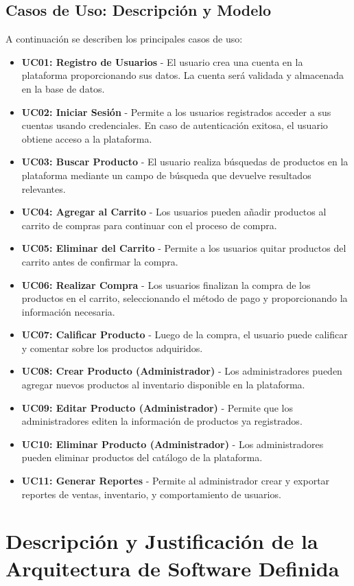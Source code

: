 \documentclass[12pt]{article}
\begin{document}
\subsection{Casos de Uso: Descripción y Modelo}
A continuación se describen los principales casos de uso:
\begin{itemize}
    \item \textbf{UC01: Registro de Usuarios} - El usuario crea una cuenta en la plataforma proporcionando sus datos. La cuenta será validada y almacenada en la base de datos.
    \item \textbf{UC02: Iniciar Sesión} - Permite a los usuarios registrados acceder a sus cuentas usando credenciales. En caso de autenticación exitosa, el usuario obtiene acceso a la plataforma.
    \item \textbf{UC03: Buscar Producto} - El usuario realiza búsquedas de productos en la plataforma mediante un campo de búsqueda que devuelve resultados relevantes.
    \item \textbf{UC04: Agregar al Carrito} - Los usuarios pueden añadir productos al carrito de compras para continuar con el proceso de compra.
    \item \textbf{UC05: Eliminar del Carrito} - Permite a los usuarios quitar productos del carrito antes de confirmar la compra.
    \item \textbf{UC06: Realizar Compra} - Los usuarios finalizan la compra de los productos en el carrito, seleccionando el método de pago y proporcionando la información necesaria.
    \item \textbf{UC07: Calificar Producto} - Luego de la compra, el usuario puede calificar y comentar sobre los productos adquiridos.
    \item \textbf{UC08: Crear Producto (Administrador)} - Los administradores pueden agregar nuevos productos al inventario disponible en la plataforma.
    \item \textbf{UC09: Editar Producto (Administrador)} - Permite que los administradores editen la información de productos ya registrados.
    \item \textbf{UC10: Eliminar Producto (Administrador)} - Los administradores pueden eliminar productos del catálogo de la plataforma.
    \item \textbf{UC11: Generar Reportes} - Permite al administrador crear y exportar reportes de ventas, inventario, y comportamiento de usuarios.
\end{itemize}

\section{Descripción y Justificación de la Arquitectura de Software Definida}
\end{document}
